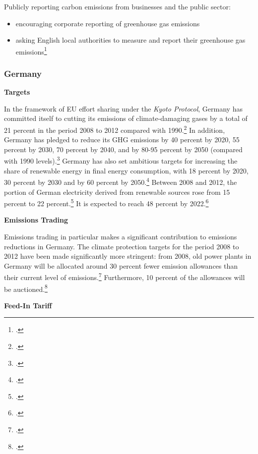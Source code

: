Publicly reporting carbon emissions from businesses and the public sector:
\begin{itemize}
	\item encouraging corporate reporting of greenhouse gas emissions
	\item asking English local authorities to measure and report their greenhouse gas emissions\footcite[][]{UKgovnt}
\end{itemize}



	\subsubsection{Germany}
	
	

\textbf{Targets}



In the framework of EU effort sharing under the \emph{Kyoto Protocol}, Germany has committed itself to cutting its emissions of climate-damaging gases by a total of 21 percent in the period 2008 to 2012 compared with 1990.\footcite[][]{KyotoTargetsGermany}
In addition, Germany has pledged to reduce its GHG emissions by 40 percent by 2020, 55 percent by 2030, 70 percent by 2040, and by 80-95 percent by 2050 (compared with 1990 levels).\footcite[][]{GermanyGHG}
Germany has also set ambitious targets for increasing the share of renewable energy in final energy consumption, with 18 percent by 2020, 30 percent by 2030 and by 60 percent by 2050.\footcite[][]{GermanyGHG}
Between 2008 and 2012, the portion of German electricity derived from renewable sources rose from 15 percent to 22 percent.\footcite[][p. 12]{EconWindmills}
It is expected to reach 48 percent by 2022.\footcite[][]{EconWindmills}



\textbf{Emissions Trading}



Emissions trading in particular makes a significant contribution to emissions reductions in Germany. 
The climate protection targets for the period 2008 to 2012 have been made significantly more stringent: from 2008, old power plants in Germany will be allocated around 30 percent fewer emission allowances than their current level of emissions.\footcite[][]{BMUprogramme}
Furthermore, 10 percent of the allowances will be auctioned.\footcite[][]{GermanyTrading}



\textbf{Feed-In Tariff}



